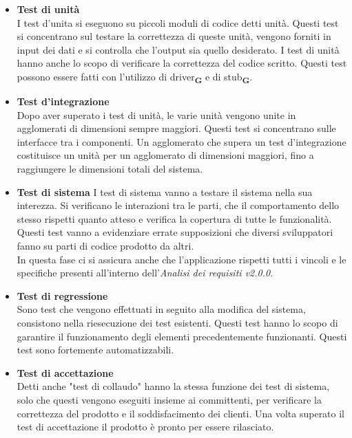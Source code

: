 \begin{itemize}
    \item \textbf{Test di unità}\\
          I test d'unita si eseguono su piccoli moduli di codice detti unità. Questi test si concentrano sul testare la correttezza di queste unità, vengono forniti in input dei dati e si controlla che l'output sia quello desiderato. I test di unità hanno anche lo scopo di verificare la correttezza del codice scritto. Questi test possono essere fatti con l'utilizzo di driver\textsubscript{\textbf{G}} e di stub\textsubscript{\textbf{G}}.
    \item \textbf{Test d'integrazione}\\
          Dopo aver superato i test di unità, le varie unità vengono unite in agglomerati di dimensioni sempre maggiori. Questi test si concentrano sulle interfacce tra i componenti. Un agglomerato che supera un test d'integrazione costituisce un unità per un agglomerato di dimensioni maggiori, fino a raggiungere le dimensioni totali del sistema.
    \item \textbf{Test di sistema}
          I test di sistema vanno a testare il sistema nella sua interezza. Si verificano le interazioni tra le parti, che il comportamento dello stesso rispetti quanto atteso e verifica la copertura di tutte le funzionalità. Questi test vanno a evidenziare errate supposizioni che diversi sviluppatori fanno su parti di codice prodotto da altri.\\
          In questa fase ci si assicura anche che l'applicazione rispetti tutti i vincoli e le specifiche presenti all'interno dell'\textit{Analisi dei requisiti v2.0.0}.
    \item \textbf{Test di regressione}\\
          Sono test che vengono effettuati in seguito alla modifica del sistema, consistono nella riesecuzione dei test esistenti. Questi test hanno lo scopo di garantire il funzionamento degli elementi precedentemente funzionanti. Questi test sono fortemente automatizzabili.
    \item \textbf{Test di accettazione}\\
          Detti anche "test di collaudo" hanno la stessa funzione dei test di sistema, solo che questi vengono eseguiti insieme ai committenti, per verificare la correttezza del prodotto e il soddisfacimento dei clienti. Una volta superato il test di accettazione il prodotto è pronto per essere rilasciato.

\end{itemize}
